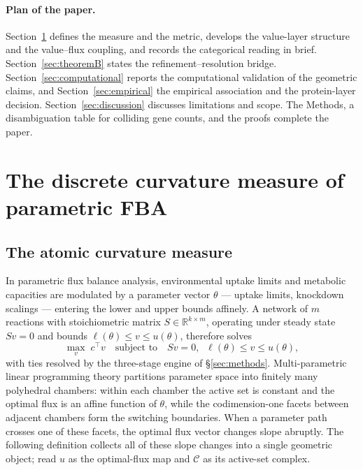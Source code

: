 \documentclass[11pt,a4paper]{article}
\theoremstyle{plain}
\theoremstyle{definition}
\theoremstyle{remark}
\newcommand{\CC}{\mathcal{C}}
\newcommand{\RR}{\mathbb{R}}
\begin{document}
\paragraph{Plan of the paper.}
Section~\ref{sec:measure} defines the measure and the metric, develops
the value-layer structure and the value--flux coupling, and records the
categorical reading in brief. Section~\ref{sec:theoremB} states the
refinement--resolution bridge. Section~\ref{sec:computational} reports
the computational validation of the geometric claims, and
Section~\ref{sec:empirical} the empirical association and the
protein-layer decision. Section~\ref{sec:discussion} discusses
limitations and scope. The Methods, a disambiguation table for
colliding gene counts, and the proofs complete the paper.

\section{The discrete curvature measure of parametric FBA}
\label{sec:measure}



\subsection{The atomic curvature measure}

In parametric flux balance analysis, environmental uptake limits and
metabolic capacities are modulated by a parameter vector $\theta$ ---
uptake limits, knockdown scalings --- entering the lower and upper
bounds affinely. A network of $m$ reactions with stoichiometric matrix
$S \in \RR^{k \times m}$, operating under steady state $Sv = 0$ and
bounds $\ell(\theta) \le v \le u(\theta)$, therefore solves
\begin{equation}\label{eq:fba_lp}
\max_{v}\; c^\top v
\quad \text{subject to} \quad
Sv = 0, \;\; \ell(\theta) \le v \le u(\theta),
\end{equation}
with ties resolved by the three-stage engine of \S\ref{sec:methods}.
Multi-parametric linear programming theory \citep{borrelli2003}
partitions parameter space into finitely many polyhedral chambers:
within each chamber the active set is constant and the optimal flux
is an affine function of $\theta$, while the codimension-one facets
between adjacent chambers form the switching boundaries. When a
parameter path crosses one of these facets, the optimal flux vector
changes slope abruptly. The following definition collects all of
these slope changes into a single geometric object; read $u$ as the
optimal-flux map and $\CC$ as its active-set complex.
\end{document}
